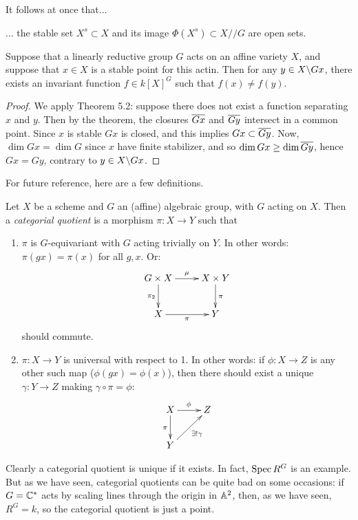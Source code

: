 \documentclass[11pt, english]{article}
\begin{document}
It follows at once that...
\begin{prop}
... the stable set $X^s \subset X$ and its image $\Phi(X^s) \subset X /\!/ G$ are open sets.
\end{prop}

\begin{thm}
 Suppose that a linearly reductive group $G$ acts on an affine variety $X$, and suppose that $x \in X$ is a stable point for this actin. Then for any $y \in X \backslash Gx$, there exists an invariant function $f \in k[X] ^G$ such that $f(x) \neq f(y)$.
\end{thm}
\begin{proof}
 We apply Theorem 5.2: suppose there does not exist a function separating $x$ and $y$. Then by the theorem, the closures $\overline{Gx}$ and $\overline{Gy}$ intersect in a common point. Since $x$ is stable $Gx$ is closed, and this implies $Gx \subset \overline{Gy}$. Now, $\dim Gx=\dim G$ since $x$ have finite stabilizer, and so $\dim Gx \geq \dim \overline{Gy}$, hence $Gx=Gy$, contrary to $y \in X \backslash Gx$. 
\end{proof}

For future reference, here are a few definitions.

\begin{defi}
 Let $X$ be a scheme and $G$ an (affine) algebraic group, with $G$ acting on $X$. Then a \emph{categorial quotient} is a morphism $\pi:X \to Y$ such that
 \begin{enumerate}
 \item $\pi$ is $G$-equivariant with $G$ acting trivially on $Y$. In other words: $\pi(gx)=\pi(x)$ for all $g,x$. Or: 
\[
\xymatrix{
G \times X \ar[d]_{\pi_2} \ar[r]^\mu & X \times Y \ar[d]^\pi \\
X \ar[r]_\pi & Y
}
\]
should commute.
\item $\pi:X \to Y$ is universal with respect to 1. In other words: if $\phi:X \to Z$ is any other such map ($\phi(gx)=\phi(x)$), then there should exist a unique $\gamma:Y \to Z$ making $\gamma \circ \pi = \phi$:
\[
\xymatrix{
X \ar[r]^\phi \ar[d]_\pi & Z \\
Y \ar[ur]_{\exists ! \gamma}
}
\]
 \end{enumerate}
\end{defi}
Clearly a categorial quotient is unique if it exists. In fact, $\operatorname{Spec} R^G$ is an example. But as we have seen, categorial quotients can be quite bad on some occasions: if $G=\mathbb{C}^\ast$ acts by scaling lines through the origin in $\mathbb{A}^2$, then, as we have seen, $R^G=k$, so the categorial quotient is just a point.
\end{document}
